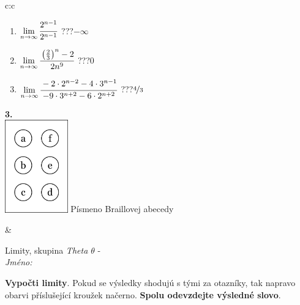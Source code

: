 \documentclass[10pt]{report}
\begin{document}
\begin{tabular}{c:c}
\begin{minipage}[c][104.5mm][t]{0.5\linewidth}
\begin{center}
\begin{minipage}{0.79\linewidth}
\begin{center}
\begin{varwidth}{\linewidth}
\begin{enumerate}
\item $\lim\limits_{n\to\infty}\cfrac{2^{n-1}}{2^{n-1}}$\quad \dotfill\; ???\;\dotfill \quad $-\infty$
\item $\lim\limits_{n\to\infty}\cfrac{\left(\frac{2}{3}\right)^n -2}{2n^{9}}$\quad \dotfill\; ???\;\dotfill \quad $0$
\item $\lim\limits_{n\to\infty}\cfrac{-2\cdot 2^{n-2}-4\cdot 3^{n-1}}{-9\cdot 3^{n+2}-6\cdot 2^{n+2}}$\quad \dotfill\; ???\;\dotfill \quad $\nicefrac{4}{3}$
\end{enumerate}
\end{varwidth}
\end{center}
\end{minipage}
\begin{minipage}{0.20\linewidth}
\begin{center}
{\Huge\bfseries 3.} \\[2mm]
\includegraphics[height=40mm]{../images/braille.png}
{\small Písmeno Braillovej abecedy}
\end{center}
\end{minipage}
\end{center}
\end{minipage}
&
\begin{minipage}[c][104.5mm][t]{0.5\linewidth}
\begin{center}
\vspace{7mm}
{\huge Limity, skupina \textit{Theta $\theta$} -}\\[5mm]
\textit{Jméno:}\phantom{xxxxxxxxxxxxxxxxxxxxxxxxxxxxxxxxxxxxxxxxxxxxxxxxxxxxxxxxxxxxxxxxx}\\[5mm]
\begin{minipage}{0.95\linewidth}
\begin{center}
\textbf{Vypočti limity}. Pokud se výsledky shodujú s tými za otazníky, tak napravo\\obarvi příslušející kroužek načerno. \textbf{Spolu odevzdejte výsledné slovo}.
\end{center}
\end{minipage}
\\[1mm]
\begin{minipage}{0.79\linewidth}

\end{minipage}
\end{center}
\end{minipage}
\end{tabular}
\end{document}
